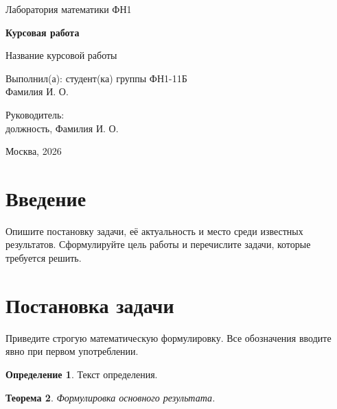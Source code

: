 \documentclass[14pt, a4paper]{extarticle}
\theoremstyle{plain}
\newtheorem{theorem}{Теорема}[section]
\theoremstyle{definition}
\newtheorem{definition}[theorem]{Определение}
\newcommand{\workTitle}{Название курсовой работы}
\newcommand{\workAuthor}{Фамилия И. О.}
\newcommand{\workGroup}{ФН1-11Б}
\newcommand{\workSupervisor}{должность, Фамилия И. О.}
\newcommand{\workYear}{2026}
\begin{document}
\begin{titlepage}
  \centering
  \large

  Лаборатория математики ФН1

  \vfill

  {\Large\bfseries Курсовая работа}

  \vspace{1cm}

  {\Large \workTitle}

  \vfill

  \begin{flushright}
    \begin{minipage}{0.5\textwidth}
      Выполнил(а): студент(ка) группы \workGroup\\
      \workAuthor

      \vspace{0.7cm}

      Руководитель:\\
      \workSupervisor
    \end{minipage}
  \end{flushright}

  \vfill

  Москва, \workYear
\end{titlepage}

\setcounter{page}{2}
\tableofcontents
\newpage

\section{Введение}

Опишите постановку задачи, её актуальность и место среди известных результатов.
Сформулируйте цель работы и перечислите задачи, которые требуется решить.

\section{Постановка задачи}

Приведите строгую математическую формулировку. Все обозначения вводите
явно при первом употреблении.

\begin{definition}
  Текст определения.
\end{definition}

\begin{theorem}\label{th:main}
  Формулировка основного результата.
\end{theorem}
\end{document}
